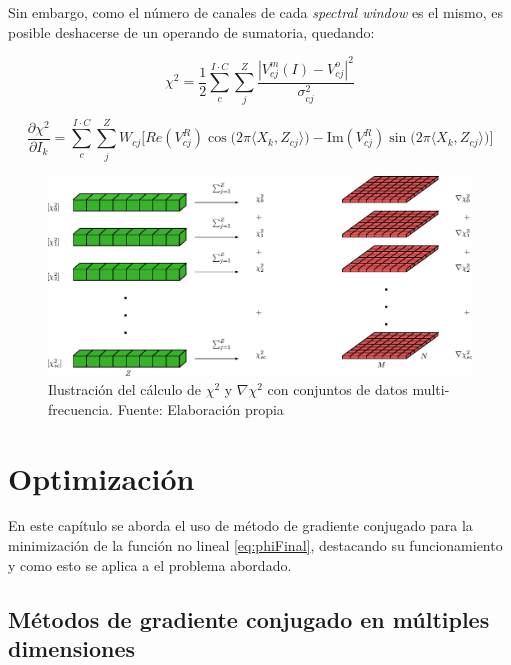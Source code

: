 Sin embargo, como el número de canales de cada \textit{spectral window} es el mismo, es posible deshacerse de un operando de sumatoria, quedando:

\begin{equation}
	\chi^{2} = \frac{1}{2}\sum_{c}^{I \cdot C}\sum_{j}^{Z}\frac{|V^m_{cj}(I)-V^o_{cj}|^2}{\sigma_{cj}^2}
	\label{eq:chi2-multi}
\end{equation}

\begin{equation}
	\frac{\partial\chi^{2}}{\partial I_{k}} = \sum_{c}^{I \cdot C}\sum_{j}^{Z} W_{cj}\biggl[Re(V_{cj}^{R})\cos\bigl(2\pi \langle X_k,Z_{cj}\rangle\bigr)-\text{Im}(V_{cj}^{R})\sin\bigl(2\pi \langle X_k,Z_{cj}\rangle\bigr)\biggr]
	\label{eq:dchi2-multi}
\end{equation}

\begin{figure}[h!]
	\centering
	\includegraphics[scale=0.75]{./images/matrixandvector.eps}
	\caption{Ilustración del cálculo de $\chi^{2}$ y $\nabla \chi^{2}$ con conjuntos de datos multi-frecuencia. Fuente: Elaboración propia}
	\label{fig:matrixandvector}
\end{figure}





\chapter{Optimización}
\label{cap:opti}

En este capítulo se aborda el uso de método de gradiente conjugado para la minimización de la función no lineal \ref{eq:phiFinal}, destacando su funcionamiento y como esto se aplica a el problema abordado.

\section{Métodos de gradiente conjugado en múltiples dimensiones}

